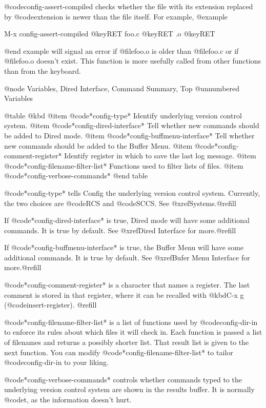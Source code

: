 @code{config-assert-compiled} checks whether the file with its
extension replaced by @code{extension} is newer than the file itself.
For example,
@example

	M-x config-assert-compiled @key{RET} foo.c @key{RET} .o @key{RET}

@end example
will signal an error if @file{foo.o} is older than @file{foo.c}
or if @file{foo.o} doesn't exist.  This function is more usefully
called from other functions than from the keyboard.

@node Variables, Dired Interface, Command Summary, Top
@unnumbered Variables

@table @kbd
@item @code{*config-type*}
Identify underlying version control system.
@item @code{*config-dired-interface*}
Tell whether new commands should be added to Dired mode.
@item @code{*config-buffmenu-interface*}
Tell whether new commands should be added to the Buffer Menu.
@item @code{*config-comment-register*}
Identify register in which to save the last log message.
@item @code{*config-filename-filter-list*}
Functions used to filter lists of files.
@item @code{*config-verbose-commands*}
@end table

@code{*config-type*} tells Config the underlying version control
system.  Currently, the two choices are @code{RCS} and @code{SCCS}.
See @xref{Systems}.@refill

If @code{*config-dired-interface*} is true, Dired mode will have some
additional commands.  It is true by default.  See @xref{Dired
Interface} for more.@refill

If @code{*config-buffmenu-interface*} is true, the Buffer Menu will
have some additional commands.  It is true by default.  See
@xref{Bufer Menu Interface} for more.@refill

@code{*config-comment-register*} is a character that names a register.
The last comment is stored in that register, where it can be
recalled with @kbd{C-x g} (@code{insert-register}).  @refill

@code{*config-filename-filter-list*} is a list of functions used by
@code{config-dir-in} to enforce its rules about which files it will
check in.  Each function is passed a list of filenames and returns a
possibly shorter list.  That result list is given to the next
function.  You can modify @code{*config-filename-filter-list*} to
tailor @code{config-dir-in} to your liking.

@code{*config-verbose-commands*} controls whether commands typed to
the underlying version control system are shown in the results buffer.
It is normally @code{t}, as the information doesn't hurt.

